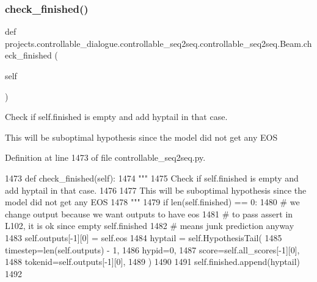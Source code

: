\subsubsection{\texorpdfstring{check\+\_\+finished()}{check\_finished()}}
{\footnotesize\ttfamily def projects.\+controllable\+\_\+dialogue.\+controllable\+\_\+seq2seq.\+controllable\+\_\+seq2seq.\+Beam.\+check\+\_\+finished (\begin{DoxyParamCaption}\item[{}]{self }\end{DoxyParamCaption})}

\begin{DoxyVerb}Check if self.finished is empty and add hyptail in that case.

This will be suboptimal hypothesis since the model did not get any EOS
\end{DoxyVerb}
 

Definition at line 1473 of file controllable\+\_\+seq2seq.\+py.


\begin{DoxyCode}
1473     \textcolor{keyword}{def }check\_finished(self):
1474         \textcolor{stringliteral}{"""}
1475 \textcolor{stringliteral}{        Check if self.finished is empty and add hyptail in that case.}
1476 \textcolor{stringliteral}{}
1477 \textcolor{stringliteral}{        This will be suboptimal hypothesis since the model did not get any EOS}
1478 \textcolor{stringliteral}{        """}
1479         \textcolor{keywordflow}{if} len(self.finished) == 0:
1480             \textcolor{comment}{# we change output because we want outputs to have eos}
1481             \textcolor{comment}{# to pass assert in L102, it is ok since empty self.finished}
1482             \textcolor{comment}{# means junk prediction anyway}
1483             self.outputs[-1][0] = self.eos
1484             hyptail = self.HypothesisTail(
1485                 timestep=len(self.outputs) - 1,
1486                 hypid=0,
1487                 score=self.all\_scores[-1][0],
1488                 tokenid=self.outputs[-1][0],
1489             )
1490 
1491             self.finished.append(hyptail)
1492 
\end{DoxyCode}
\mbox{\label{classprojects_1_1controllable__dialogue_1_1controllable__seq2seq_1_1controllable__seq2seq_1_1Beam_a11a1f8185f11636128be8c25b1d2d56a}} 
